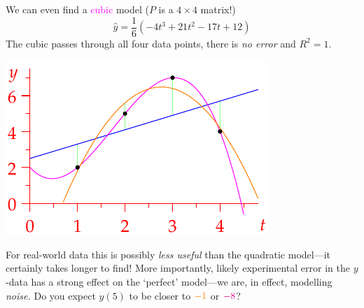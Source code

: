 \begin{example}{}{}
\begin{enumerate}
\begin{minipage}[t]{0.58\linewidth}
			\item We can even find a \textcolor{magenta}{cubic} model ($P$ is a $4\times 4$ matrix!)
			\[
				\hat y=\frac 1{6}(-4t^3+21t^2-17t+12)
			\]
			The cubic passes through all four data points, there is \emph{no error} and $R^2=1$.
		\end{minipage}
		\hfill
		\begin{minipage}[t]{0.4\linewidth}\vspace{-12pt}
			\flushright\includegraphics[scale=1]{reg-quad1}
		\end{minipage}
		\smallbreak
		For real-world data this is possibly \emph{less useful} than the quadratic model---it certainly takes longer to find! More importantly, likely experimental error in the $y$-data has a strong effect on the `perfect' model---we are, in effect, modelling \emph{noise.} Do you expect $y(5)$ to be closer to $\textcolor{orange}{-1}$ or $\textcolor{magenta}{-8}$?
	\end{enumerate}
\end{example}

\goodbreak


% 

